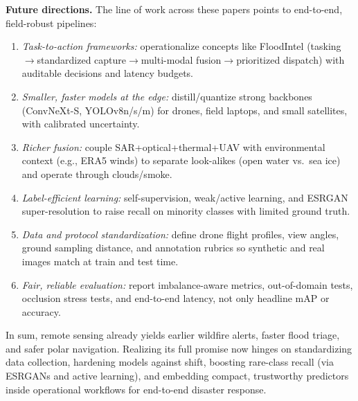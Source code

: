 \documentclass[conference,a4paper]{IEEEtran}
\begin{document}
\textbf{Future directions.} The line of work across these papers points to end-to-end, field-robust pipelines:
\begin{enumerate}
  \item \textit{Task-to-action frameworks:} operationalize concepts like FloodIntel (tasking$\rightarrow$standardized capture$\rightarrow$multi-modal fusion$\rightarrow$prioritized dispatch) with auditable decisions and latency budgets.
  \item \textit{Smaller, faster models at the edge:} distill/quantize strong backbones (ConvNeXt-S, YOLOv8n/s/m) for drones, field laptops, and small satellites, with calibrated uncertainty.
  \item \textit{Richer fusion:} couple SAR+optical+thermal+UAV with environmental context (e.g., ERA5 winds) to separate look-alikes (open water vs.\ sea ice) and operate through clouds/smoke.
  \item \textit{Label-efficient learning:} self-supervision, weak/active learning, and ESRGAN super-resolution to raise recall on minority classes with limited ground truth.
  \item \textit{Data and protocol standardization:} define drone flight profiles, view angles, ground sampling distance, and annotation rubrics so synthetic and real images match at train and test time.
  \item \textit{Fair, reliable evaluation:} report imbalance-aware metrics, out-of-domain tests, occlusion stress tests, and end-to-end latency, not only headline mAP or accuracy.
\end{enumerate}

In sum, remote sensing already yields earlier wildfire alerts, faster flood triage, and safer polar navigation. Realizing its full promise now hinges on standardizing data collection, hardening models against shift, boosting rare-class recall (via ESRGANs and active learning), and embedding compact, trustworthy predictors inside operational workflows for end-to-end disaster response.




  
\end{document}
